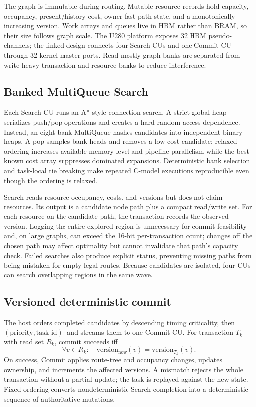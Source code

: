 \documentclass[sigconf,anonymous,review]{acmart}
\begin{document}
The graph is immutable during routing. Mutable resource records hold capacity,
occupancy, present/history cost, owner fast-path state, and a monotonically
increasing version. Work arrays and queues live in HBM rather than BRAM, so
their size follows graph scale. The U280 platform exposes 32 HBM
pseudo-channels; the linked design connects four Search CUs and one Commit CU
through 32 kernel master ports. Read-mostly graph banks are separated from
write-heavy transaction and resource banks to reduce interference.

\subsection{Banked MultiQueue Search}

Each Search CU runs an A*-style connection search. A strict global heap
serializes push/pop operations and creates a hard random-access dependence.
Instead, an eight-bank MultiQueue hashes candidates into independent binary
heaps. A pop samples bank heads and removes a low-cost candidate; relaxed
ordering increases available memory-level and pipeline parallelism while the
best-known cost array suppresses dominated expansions. Deterministic bank
selection and task-local tie breaking make repeated C-model executions
reproducible even though the ordering is relaxed.

Search reads resource occupancy, costs, and versions but does not claim
resources. Its output is a candidate node path plus a compact read/write set.
For each resource on the candidate path, the transaction records the observed
version. Logging the entire explored region is unnecessary for commit
feasibility and, on large graphs, can exceed the 16-bit per-transaction count;
changes off the chosen path may affect optimality but cannot invalidate that
path's capacity check. Failed
searches also produce explicit status, preventing missing paths from being
mistaken for empty legal routes. Because candidates are isolated, four CUs can
search overlapping regions in the same wave.

\subsection{Versioned deterministic commit}

The host orders completed candidates by descending timing criticality, then
$(\text{priority},\text{task-id})$, and
streams them to one Commit CU. For transaction $T_k$ with read set $R_k$, commit
succeeds iff
\begin{equation}
 \forall v\in R_k:\quad \mathrm{version}_{\mathrm{now}}(v)
                  =\mathrm{version}_{T_k}(v).
\end{equation}
On success, Commit applies route-tree and occupancy changes, updates ownership,
and increments the affected versions. A mismatch rejects the whole transaction
without a partial update; the task is replayed against the new state. Fixed
ordering converts nondeterministic Search completion into a deterministic
sequence of authoritative mutations.
\end{document}
